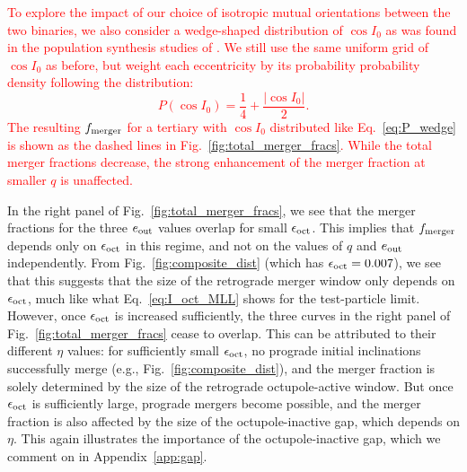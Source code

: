 \documentclass[
        fleqn,
        usenatbib,
    ]{mnras}
\newcommand*{\abs}[1]{\left|#1\right|}
\newcommand*{\p}[1]{\left(#1\right)}
\begin{document}
\textcolor{red}{To explore the impact of our choice of isotropic mutual
orientations between the two binaries, we also consider a wedge-shaped
distribution of $\cos I_0$ as was found in the population synthesis studies of
\citet{antonini2017binary}. We still use the same uniform grid of $\cos I_0$ as
before, but weight each eccentricity by its probability probability density
following the distribution:
\begin{equation}
    P\p{\cos I_0} = \frac{1}{4} + \frac{\abs{\cos I_0}}{2}.\label{eq:P_wedge}
\end{equation}
The resulting $f_{\rm merger}$ for a tertiary with $\cos I_0$ distributed like
Eq.~\eqref{eq:P_wedge} is shown as the dashed lines in
Fig.~\ref{fig:total_merger_fracs}. While the total merger fractions decrease,
the strong enhancement of the merger fraction at smaller $q$ is unaffected.}

In the right panel of Fig.~\ref{fig:total_merger_fracs}, we see that the merger
fractions for the three $e_{\rm out}$ values overlap for small $\epsilon_{\rm
oct}$. This implies that $f_{\rm merger}$ depends only on $\epsilon_{\rm oct}$
in this regime, and not on the values of $q$ and $e_{\rm out}$ independently.
From Fig.~\ref{fig:composite_dist} (which has $\epsilon_{\rm oct} = 0.007$), we
see that this suggests that the size of the retrograde merger window only
depends on $\epsilon_{\rm oct}$, much like what Eq.~\eqref{eq:I_oct_MLL} shows
for the test-particle limit. However, once $\epsilon_{\rm oct}$ is increased
sufficiently, the three curves in the right panel of
Fig.~\ref{fig:total_merger_fracs} cease to overlap. This can be attributed to
their different $\eta$ values: for sufficiently small $\epsilon_{\rm oct}$, no
prograde initial inclinations successfully merge (e.g.,
Fig.~\ref{fig:composite_dist}), and the merger fraction is solely determined by
the size of the retrograde octupole-active window. But once $\epsilon_{\rm oct}$
is sufficiently large, prograde mergers become possible, and the merger fraction
is also affected by the size of the octupole-inactive gap, which depends on
$\eta$. This again illustrates the importance of the octupole-inactive gap,
which we comment on in Appendix~\ref{app:gap}.
\end{document}

